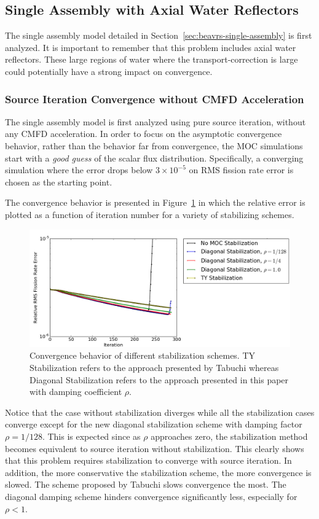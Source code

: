 \subsection{Single Assembly with Axial Water Reflectors}
\label{sec:sa-axial-ref}

The single assembly model detailed in Section~\ref{sec:beavrs-single-assembly} is first analyzed. It is important to remember that this problem includes axial water reflectors. These large regions of water where the transport-correction is large could potentially have a strong impact on convergence.

\subsubsection{Source Iteration Convergence without CMFD Acceleration}

The single assembly model is first analyzed using pure source iteration, without any \ac{CMFD} acceleration. In order to focus on the asymptotic convergence behavior, rather than the behavior far from convergence, the \ac{MOC} simulations start with a \textit{good guess} of the scalar flux distribution. Specifically, a converging simulation where the error drops below $3\times 10^{-5}$ on \ac{RMS} fission rate error is chosen as the starting point.

The convergence behavior is presented in Figure~\ref{fig:no-cmfd} in which the relative error is plotted as a function of iteration number for a variety of stabilizing schemes.
\begin{figure}[ht!]
	\centering
	\includegraphics[width=1.0\linewidth]{figures/convergence/no_cmfd.png}
	\caption{Convergence behavior of different stabilization schemes. TY Stabilization refers to the approach presented by Tabuchi whereas Diagonal Stabilization refers to the approach presented in this paper with damping coefficient $\rho$.}
	\label{fig:no-cmfd}
\end{figure}
Notice that the case without stabilization diverges while all the stabilization cases converge except for the new diagonal stabilization scheme with damping factor $\rho = 1/128$. This is expected since as $\rho$ approaches zero, the stabilization method becomes equivalent to source iteration without stabilization. This clearly shows that this problem requires stabilization to converge with source iteration. In addition, the more conservative the stabilization scheme, the more convergence is slowed. The scheme proposed by Tabuchi slows convergence the most. The diagonal damping scheme hinders convergence significantly less, especially for $\rho < 1$.

